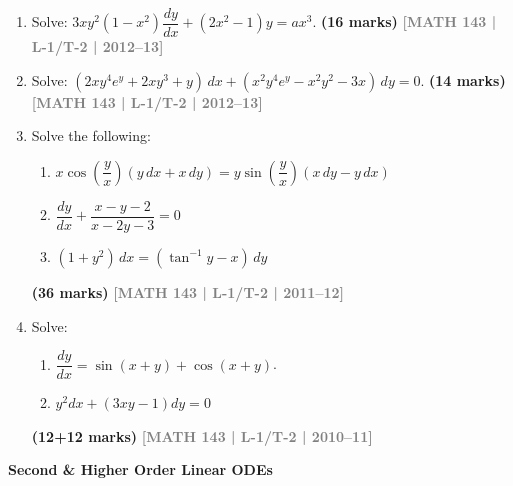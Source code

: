 \documentclass[12pt,a3paper]{article}
\newcommand{\yr}[1]{\hfill\textcolor{gray}{\small\textbf{[#1]}}}
\newcommand{\mk}[1]{\textcolor{orange!70!black}{\small\textbf{(#1 marks)}}}
\newcommand{\subtopic}[2]{%
  \vspace{10pt}
  \noindent\begin{tcolorbox}[colback=#1!8,colframe=#1,boxrule=0.6pt,arc=4pt,
    left=6pt,right=6pt,top=4pt,bottom=4pt]
    \small\bfseries\textcolor{#1}{#2}
  \end{tcolorbox}
  \vspace{2pt}
}
\begin{document}
\begin{enumerate}
\item Solve: $3xy^{2}(1-x^{2})\dfrac{dy}{dx}+(2x^{2}-1)y=ax^{3}$.
\mk{16} \yr{MATH 143 | L-1/T-2 | 2012--13}

\item Solve: $(2xy^{4}e^{y}+2xy^{3}+y)\,dx+(x^{2}y^{4}e^{y}-x^{2}y^{2}-3x)\,dy=0$.
\mk{14} \yr{MATH 143 | L-1/T-2 | 2012--13}

\item Solve the following:
\begin{enumerate}
  \item $x\cos\!\left(\dfrac{y}{x}\right)(y\,dx+x\,dy)=y\sin\!\left(\dfrac{y}{x}\right)(x\,dy-y\,dx)$
  \item $\dfrac{dy}{dx}+\dfrac{x-y-2}{x-2y-3}=0$
  \item $(1+y^{2})\,dx=(\tan^{-1}y - x)\,dy$
\end{enumerate}
\mk{36} \yr{MATH 143 | L-1/T-2 | 2011--12}

\item Solve: 
\begin{enumerate}
\item $\dfrac{dy}{dx}=\sin(x+y)+\cos(x+y)$.
\item  $y^2 dx + (3xy - 1)dy = 0$
\end{enumerate}
\mk{12+12} \yr{MATH 143 | L-1/T-2 | 2010--11}

\end{enumerate}

\subtopic{cC}{Second \& Higher Order Linear ODEs}
\label{sub:s3-linear}
\end{document}
